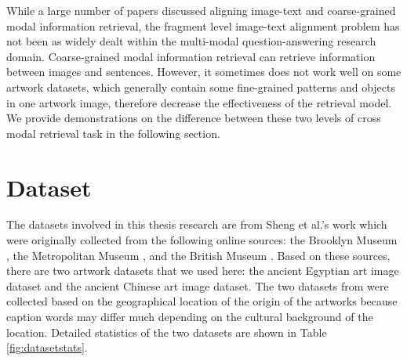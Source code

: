 While a large number of papers discussed aligning image-text and coarse-grained modal information retrieval, the fragment level image-text alignment problem has not been as widely dealt within the multi-modal question-answering research domain. Coarse-grained modal information retrieval can retrieve information between images and sentences. However, it sometimes does not work well on some artwork datasets, which generally contain some fine-grained patterns and objects in one artwork image, therefore decrease the effectiveness of the retrieval model. We provide demonstrations on the difference between these two levels of cross modal retrieval task in the following section.




\section{Dataset}

The datasets involved in this thesis research are from Sheng et al.'s work \cite{artworkcaption} which were originally collected from the following online sources: the Brooklyn Museum \cite{brooklynmuseum}, the Metropolitan Museum \cite{themet}, and the British Museum \cite{thebritishmuseum}. Based on these sources, there are two artwork datasets that we used here: the ancient Egyptian art image dataset and the ancient Chinese art image dataset. The two datasets from \cite{artworkcaption} were collected based on the geographical location of the origin of the artworks because caption words may differ much depending on the cultural background of the location. Detailed statistics of the two datasets are shown in Table \ref{fig:datasetstats}. 

